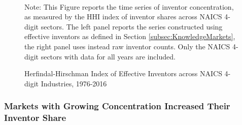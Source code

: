 \begin{figure}[t]
\begin{centering}
\caption{Herfindal-Hirschman Index of Effective Inventors across NAICS 4-digit
Industries, 1976-2016 \label{fig:Effective-inventor-HHI}}
\par\end{centering}
\\

\raggedright{}{\small{}Note: This Figure reports the time series of
inventor concentration, as measured by the HHI index of inventor shares
across NAICS 4-digit sectors. The left panel reports the series constructed
using effective inventors as defined in Section \ref{subsec:KnowledgeMarkets},
the right panel uses instead raw inventor counts. Only the NAICS 4-digit
sectors with data for all years are included.}{\small\par}
\end{figure}
\FloatBarrier

\subsubsection{Markets with Growing Concentration Increased Their Inventor Share}


